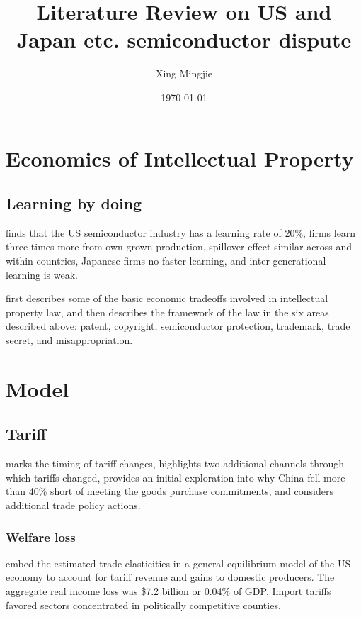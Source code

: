 \documentclass[10pt]{article} %
\title{Literature Review on US and Japan etc. semiconductor dispute}
\author{Xing Mingjie}
\date{\today} %
\begin{document}
\maketitle

\tableofcontents

\newpage

\section{Economics of Intellectual Property}
    \subsection{Learning by doing}
    \cite{IrwinKlenow1994} finds that the US semiconductor industry has a learning rate of 20\%, firms learn three times more from own-grown production, spillover effect similar across and within countries, Japanese firms no faster learning, and inter-generational learning is weak.

    \cite{BesenRaskind1991} first describes some of the basic economic tradeoffs involved in intellectual property law, and then describes the framework of the law in the six areas described above: patent, copyright, semiconductor protection, trademark, trade secret, and misappropriation.
\section{Model}
    \subsection{Tariff}
        \cite{BOWN2021} marks the timing of tariff changes, highlights two additional channels through which tariffs changed, provides an initial exploration into why China fell more than 40\% short of meeting the goods purchase commitments, and considers additional trade policy actions.

        \subsubsection{Welfare loss}
        \cite{Fajgelbaumetal2019} embed the estimated trade elasticities in a general-equilibrium model of the US economy to account for tariff revenue and gains to domestic producers. The aggregate real income loss was \$7.2 billion or 0.04\% of GDP. Import tariffs favored sectors concentrated in politically competitive counties.
\end{document}
